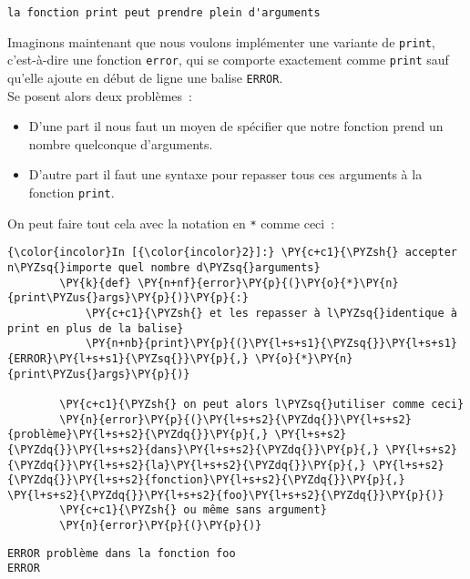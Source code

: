     \begin{Verbatim}[commandchars=\\\{\}]
la fonction print peut prendre plein d'arguments

    \end{Verbatim}

    Imaginons maintenant que nous voulons implémenter une variante de
\texttt{print}, c'est-à-dire une fonction \texttt{error}, qui se
comporte exactement comme \texttt{print} sauf qu'elle ajoute en début de
ligne une balise \texttt{ERROR}.\\

Se posent alors deux problèmes~:

\begin{itemize}
	\item 
	D'une part il nous faut un moyen de
	spécifier que notre fonction prend un nombre quelconque d'arguments.
	\item
	D'autre part il faut une syntaxe pour repasser tous ces arguments à la
	fonction \texttt{print}.
\end{itemize}

On peut faire tout cela avec la notation en \texttt{*} comme ceci~:

    \begin{Verbatim}[commandchars=\\\{\}]
{\color{incolor}In [{\color{incolor}2}]:} \PY{c+c1}{\PYZsh{} accepter n\PYZsq{}importe quel nombre d\PYZsq{}arguments}
        \PY{k}{def} \PY{n+nf}{error}\PY{p}{(}\PY{o}{*}\PY{n}{print\PYZus{}args}\PY{p}{)}\PY{p}{:}
            \PY{c+c1}{\PYZsh{} et les repasser à l\PYZsq{}identique à print en plus de la balise}
            \PY{n+nb}{print}\PY{p}{(}\PY{l+s+s1}{\PYZsq{}}\PY{l+s+s1}{ERROR}\PY{l+s+s1}{\PYZsq{}}\PY{p}{,} \PY{o}{*}\PY{n}{print\PYZus{}args}\PY{p}{)}
        
        \PY{c+c1}{\PYZsh{} on peut alors l\PYZsq{}utiliser comme ceci}
        \PY{n}{error}\PY{p}{(}\PY{l+s+s2}{\PYZdq{}}\PY{l+s+s2}{problème}\PY{l+s+s2}{\PYZdq{}}\PY{p}{,} \PY{l+s+s2}{\PYZdq{}}\PY{l+s+s2}{dans}\PY{l+s+s2}{\PYZdq{}}\PY{p}{,} \PY{l+s+s2}{\PYZdq{}}\PY{l+s+s2}{la}\PY{l+s+s2}{\PYZdq{}}\PY{p}{,} \PY{l+s+s2}{\PYZdq{}}\PY{l+s+s2}{fonction}\PY{l+s+s2}{\PYZdq{}}\PY{p}{,} \PY{l+s+s2}{\PYZdq{}}\PY{l+s+s2}{foo}\PY{l+s+s2}{\PYZdq{}}\PY{p}{)}
        \PY{c+c1}{\PYZsh{} ou même sans argument}
        \PY{n}{error}\PY{p}{(}\PY{p}{)}
\end{Verbatim}


    \begin{Verbatim}[commandchars=\\\{\}]
ERROR problème dans la fonction foo
ERROR

    \end{Verbatim}

